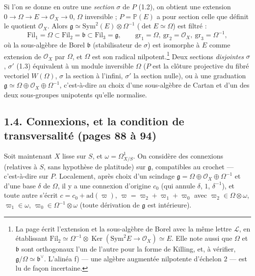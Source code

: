 \documentclass[11pt,a4paper]{article}
\begin{document}
Si l'on se donne en outre une \emph{section} $\sigma$ de $P$ (1.2), on obtient
une extension $0 \to \Omega \to E \to \mathcal{O}_X \to 0$, $\Omega$ inversible ;
$P = \mathbb{P}(E)$ a pour section celle que définit le quotient
$\mathcal{O}_X$. Alors $\mathfrak{g} \simeq \mathrm{Sym}^2(E) \otimes \Omega^{-1}$
($\det E \simeq \Omega$) est filtré :
\[
  \mathrm{Fil}_1 = \Omega \subset \mathrm{Fil}_2 = \mathfrak{b} \subset
  \mathrm{Fil}_3 = \mathfrak{g}, \qquad
  \mathrm{gr}_1 = \Omega,\ \mathrm{gr}_2 = \mathcal{O}_X,\ \mathrm{gr}_3 = \Omega^{-1},
\]
où la sous-algèbre de Borel $\mathfrak{b}$ (stabilisateur de $\sigma$) est
isomorphe à $E$ comme extension de $\mathcal{O}_X$ par $\Omega$, et $\Omega$ est
son radical nilpotent.\footnote{La page écrit l'extension et la sous-algèbre
de Borel avec la même lettre $\mathcal{L}$, en établissant
$\mathrm{Fil}_2 \simeq \Omega^{-1} \otimes \operatorname{Ker}(\mathrm{Sym}^2 E \to
\mathcal{O}_X) \simeq E$. Elle note aussi que $\Omega$ et $\mathfrak{b}$ sont
orthogonaux l'un de l'autre pour la forme de Killing, et, à vérifier,
$\mathfrak{g}/\Omega \simeq \mathfrak{b}^\vee$. L'alinéa f) — une algèbre augmentée
nilpotente d'échelon $2$ — est lu de façon incertaine.} Deux sections
\emph{disjointes} $\sigma$, $\sigma'$ (1.3) équivalent à un module inversible
$\Omega$ ($P$ est la clôture projective du fibré vectoriel $W(\Omega)$, $\sigma$
la section à l'infini, $\sigma'$ la section nulle), ou à une graduation
$\mathfrak{g} \simeq \Omega \oplus \mathcal{O}_X \oplus \Omega^{-1}$, c'est-à-dire
au choix d'une sous-algèbre de Cartan et d'un des deux sous-groupes
unipotents qu'elle normalise.

\subsection*{1.4. Connexions, et la condition de transversalité (pages 88 à 94)}

Soit maintenant $X$ lisse sur $S$, et $\omega = \Omega^1_{X/S}$. On considère
des connexions (relatives à $S$, sans hypothèse de platitude) sur
$\mathfrak{g}$, compatibles au crochet — c'est-à-dire sur $P$. Localement,
après choix d'un scindage $\mathfrak{g} = \Omega \oplus \mathcal{O}_X \oplus
\Omega^{-1}$ et d'une base $\delta$ de $\Omega$, il y a une connexion d'origine
$c_0$ (qui annule $\delta$, $1$, $\delta^{-1}$), et toute autre s'écrit
$c = c_0 + \mathrm{ad}(\varpi)$, $\varpi = \varpi_2 + \varpi_1 + \varpi_0$ avec
$\varpi_2 \in \Omega \otimes \omega$, $\varpi_1 \in \omega$, $\varpi_0 \in
\Omega^{-1} \otimes \omega$ (toute dérivation de $\mathfrak{g}$ est
intérieure).
\end{document}
